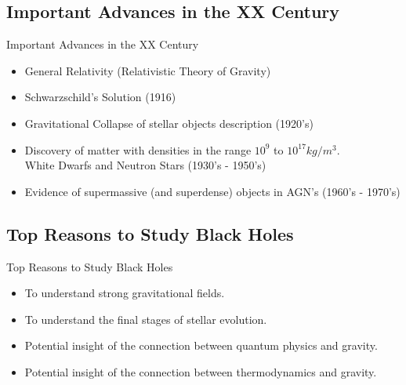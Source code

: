\documentclass{beamer}
\begin{document}
        \subsection{Important Advances in the XX Century}
        \begin{frame}{Important Advances in the XX Century}
        	\begin{itemize}
        	\item General Relativity (Relativistic Theory of Gravity)
            \pause
            \item Schwarzschild's Solution (1916)
            \pause
            \item Gravitational Collapse of stellar objects description (1920's) 
            \pause
            \item Discovery of matter with densities in the range $10^9$ to $10^{17} \si{kg \per m^3}$.\\
            White Dwarfs and Neutron Stars (1930's - 1950's)
            \pause
            \item Evidence of supermassive (and superdense) objects in AGN's (1960's - 1970's)
        	\end{itemize}      
        \end{frame}
        
        \subsection{{Top Reasons to Study Black Holes}}
        \begin{frame}{Top Reasons to Study Black Holes}
        	\begin{itemize}
        	\item To understand strong gravitational fields.
           	\pause
            \item To understand the final stages of stellar evolution.
            \pause
            \item Potential insight of the connection between quantum physics and gravity.
            \pause
            \item Potential insight of the connection between thermodynamics and gravity.
        	\end{itemize}
        \end{frame}
        
      
\end{document}
